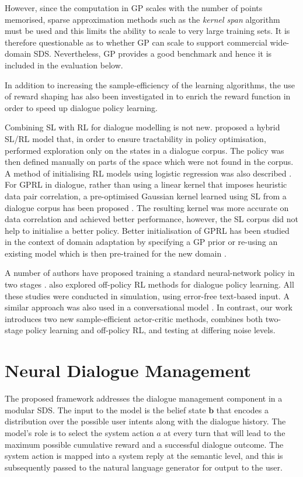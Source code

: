 \documentclass[11pt,a4paper]{article}
\begin{document}
However, since the computation in GP scales
with the number of points memorised, sparse approximation methods such as the {\it kernel span} algorithm \cite{engel2005algorithms} must be used and this limits the ability to scale to very large training sets.   It is therefore questionable as to whether GP can scale to support commercial wide-domain SDS. Nevertheless, GP provides a good benchmark and hence it is included in the evaluation below.

In addition to increasing the sample-efficiency of the learning algorithms, the use of reward shaping has also been investigated in \cite{el2014task,svgm15} to enrich the reward function in order to speed up dialogue policy learning. 

Combining SL with RL for dialogue modelling is not new.  proposed a hybrid SL/RL model that, in order to ensure tractability in policy optimisation, performed exploration only on the states in a dialogue corpus. The policy was then defined manually on parts of the space which were not found in the corpus. 
A method of initialising RL models using logistic regression was also described \cite{rieser2006using}.
For GPRL in dialogue, rather than using a linear kernel that imposes heuristic data pair correlation, a pre-optimised Gaussian kernel learned using SL from a dialogue corpus has been proposed \cite{chen2015hyper}. The resulting kernel was 
more accurate on data correlation and 
achieved better performance, however, the SL corpus did not help to initialise a better policy. Better initialisation of GPRL has been studied in the context of domain adaptation by specifying a GP prior or re-using an existing model which is then pre-trained for the new domain \cite{gbhk13}.

A number of authors have proposed training a standard neural-network policy in two stages \cite{fatemi2016policy,su2016continuously,williams2017end}.
 also explored off-policy RL methods for dialogue policy learning.
All these studies were conducted in simulation, using error-free text-based input. A similar approach was also used in a conversational model \cite{li2016deep}.
In contrast, our work introduces two new sample-efficient actor-critic methods, combines both two-stage policy learning and off-policy RL, and testing at differing noise levels.


\section{Neural Dialogue Management } \label{secmodels}
The proposed framework addresses the dialogue management component in a modular SDS.
The input to the model is the belief state $\mathbf{b}$ that encodes a distribution over the possible user intents along with the dialogue history. The model's role is to select the system action $a$ at every turn that will lead to the maximum possible cumulative reward and a successful dialogue outcome.
The system action is mapped into a system reply at the semantic level, and this is subsequently passed to the natural language generator for output to the user.
\end{document}
